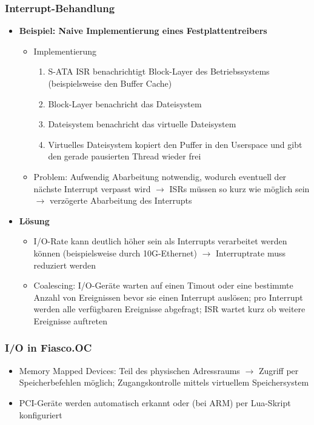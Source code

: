 \subsubsection{Interrupt-Behandlung}
\begin{itemize}
	\item \textbf{Beispiel: Naive Implementierung eines Festplattentreibers}
	\begin{itemize}
		\item Implementierung
		\begin{enumerate}
			\item S-ATA ISR benachrichtigt Block-Layer des Betriebssystems (beispielsweise den Buffer Cache)
			\item Block-Layer benachricht das Dateisystem
			\item Dateisystem benachricht das virtuelle Dateisystem
			\item Virtuelles Dateisystem kopiert den Puffer in den Userspace und gibt den gerade pausierten Thread wieder frei
		\end{enumerate}
		\item Problem: Aufwendig Abarbeitung notwendig, wodurch eventuell der nächste Interrupt verpasst wird \(\rightarrow\) ISRs müssen so kurz wie möglich sein \(\rightarrow\) verzögerte Abarbeitung des Interrupts
	\end{itemize}
	\item \textbf{Lösung}
	\begin{itemize}
		\item I/O-Rate kann deutlich höher sein als Interrupts verarbeitet werden können (beispielsweise durch 10G-Ethernet) \(\rightarrow\) Interruptrate muss reduziert werden
		\item Coalescing: I/O-Geräte warten auf einen Timout oder eine bestimmte Anzahl von Ereignissen bevor sie einen Interrupt auslösen; pro Interrupt werden alle verfügbaren Ereignisse abgefragt; ISR wartet kurz ob weitere Ereignisse auftreten
	\end{itemize}
\end{itemize}

\subsubsection{I/O in Fiasco.OC}
\begin{itemize}
	\item Memory Mapped Devices: Teil des physischen Adressraums \(\rightarrow\) Zugriff per Speicherbefehlen möglich; Zugangskontrolle mittels virtuellem Speichersystem
	\item PCI-Geräte werden automatisch erkannt oder (bei ARM) per Lua-Skript konfiguriert
\end{itemize}



